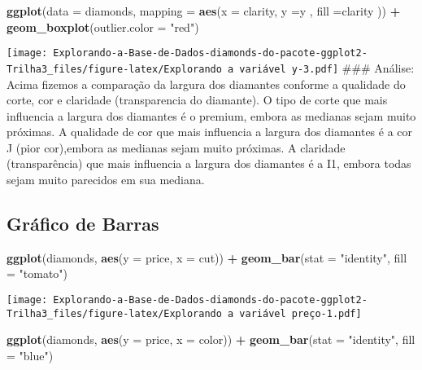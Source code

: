 \documentclass[
]{article}
\newenvironment{Shaded}{\begin{snugshade}}{\end{snugshade}}
\newcommand{\DataTypeTok}[1]{\textcolor[rgb]{0.13,0.29,0.53}{#1}}
\newcommand{\KeywordTok}[1]{\textcolor[rgb]{0.13,0.29,0.53}{\textbf{#1}}}
\newcommand{\NormalTok}[1]{#1}
\newcommand{\OperatorTok}[1]{\textcolor[rgb]{0.81,0.36,0.00}{\textbf{#1}}}
\newcommand{\StringTok}[1]{\textcolor[rgb]{0.31,0.60,0.02}{#1}}
\begin{document}
\begin{Shaded}
\begin{Highlighting}[]
\KeywordTok{ggplot}\NormalTok{(}\DataTypeTok{data =}\NormalTok{ diamonds, }\DataTypeTok{mapping =} \KeywordTok{aes}\NormalTok{(}\DataTypeTok{x =}\NormalTok{ clarity, }\DataTypeTok{y =}\NormalTok{y , }\DataTypeTok{fill =}\NormalTok{clarity )) }\OperatorTok{+}\StringTok{ }\KeywordTok{geom_boxplot}\NormalTok{(}\DataTypeTok{outlier.color =} \StringTok{"red"}\NormalTok{)}
\end{Highlighting}
\end{Shaded}

\texttt{[image: Explorando-a-Base-de-Dados-diamonds-do-pacote-ggplot2-Trilha3\_files/figure-latex/Explorando a variável y-3.pdf]}
\#\#\# Análise: Acima fizemos a comparação da largura dos diamantes
conforme a qualidade do corte, cor e claridade (transparencia do
diamante). O tipo de corte que mais influencia a largura dos diamantes é
o premium, embora as medianas sejam muito próximas. A qualidade de cor
que mais influencia a largura dos diamantes é a cor J (pior cor),embora
as medianas sejam muito próximas. A claridade (transparência) que mais
influencia a largura dos diamantes é a I1, embora todas sejam muito
parecidos em sua mediana.

\hypertarget{gruxe1fico-de-barras}{%
\subsection{Gráfico de Barras}\label{gruxe1fico-de-barras}}

\begin{Shaded}
\begin{Highlighting}[]
\KeywordTok{ggplot}\NormalTok{(diamonds, }\KeywordTok{aes}\NormalTok{(}\DataTypeTok{y =}\NormalTok{ price, }\DataTypeTok{x =}\NormalTok{ cut)) }\OperatorTok{+}\StringTok{ }\KeywordTok{geom_bar}\NormalTok{(}\DataTypeTok{stat =} \StringTok{"identity"}\NormalTok{, }\DataTypeTok{fill =} \StringTok{"tomato"}\NormalTok{)}
\end{Highlighting}
\end{Shaded}

\texttt{[image: Explorando-a-Base-de-Dados-diamonds-do-pacote-ggplot2-Trilha3\_files/figure-latex/Explorando a variável preço-1.pdf]}

\begin{Shaded}
\begin{Highlighting}[]
\KeywordTok{ggplot}\NormalTok{(diamonds, }\KeywordTok{aes}\NormalTok{(}\DataTypeTok{y =}\NormalTok{ price, }\DataTypeTok{x =}\NormalTok{ color)) }\OperatorTok{+}\StringTok{ }\KeywordTok{geom_bar}\NormalTok{(}\DataTypeTok{stat =} \StringTok{"identity"}\NormalTok{, }\DataTypeTok{fill =} \StringTok{"blue"}\NormalTok{)}
\end{Highlighting}
\end{Shaded}
\end{document}
